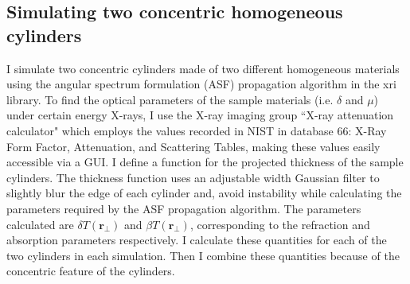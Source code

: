 \documentclass[10pt, a4paper, singlespacing]{report}
\begin{document}
\subsection{Simulating two concentric homogeneous cylinders}\label{2 cylinders}
I simulate two concentric cylinders made of two different homogeneous materials using the angular spectrum formulation (ASF) propagation algorithm in the xri library. 
To find the optical parameters of the sample materials (i.e. $\delta$ and $\mu$) under certain energy X-rays, I use the X-ray imaging group ``X-ray attenuation calculator" which employs the values recorded in NIST in database 66: X-Ray Form Factor, Attenuation, and Scattering Tables\cite{NIST}, making these values easily accessible via a GUI.
I define a function for the projected thickness of the sample cylinders. The thickness function uses an adjustable width Gaussian filter to slightly blur the edge of each cylinder and, avoid instability while calculating the parameters required by the ASF propagation algorithm. The parameters calculated are $\delta T(\mathbf{r}_{\perp})$ and $\beta T(\mathbf{r}_{\perp})$, corresponding to the refraction and absorption parameters respectively. I calculate these quantities for each of the two cylinders in each simulation. Then I combine these quantities because of the concentric feature of the cylinders.

\end{document}
